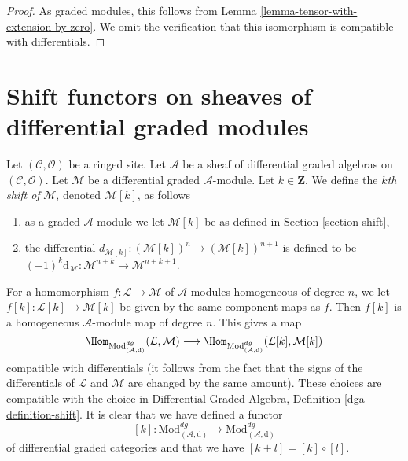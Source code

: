 \begin{proof}
As graded modules, this follows from
Lemma \ref{lemma-tensor-with-extension-by-zero}.
We omit the verification that this isomorphism
is compatible with differentials.
\end{proof}








\section{Shift functors on sheaves of differential graded modules}
\label{section-shift-dg}

\noindent
Let $(\mathcal{C}, \mathcal{O})$ be a ringed site.
Let $\mathcal{A}$ be a sheaf of differential graded algebras
on $(\mathcal{C}, \mathcal{O})$.
Let $\mathcal{M}$ be a differential graded $\mathcal{A}$-module.
Let $k \in \mathbf{Z}$. We define the {\it $k$th shift of} $\mathcal{M}$,
denoted $\mathcal{M}[k]$, as follows
\begin{enumerate}
\item as a graded $\mathcal{A}$-module we let $\mathcal{M}[k]$ be
as defined in Section \ref{section-shift},
\item the differential
$d_{\mathcal{M}[k]} : (\mathcal{M}[k])^n \to (\mathcal{M}[k])^{n + 1}$
is defined to be
$(-1)^k\text{d}_\mathcal{M} : \mathcal{M}^{n + k} \to \mathcal{M}^{n + k + 1}$.
\end{enumerate}
For a homomorphism $f : \mathcal{L} \to \mathcal{M}$ of $\mathcal{A}$-modules
homogeneous of degree $n$, we let $f[k] : \mathcal{L}[k] \to \mathcal{M}[k]$
be given by the same component maps as $f$. Then $f[k]$ is
a homogeneous $\mathcal{A}$-module map of degree $n$.
This gives a map
$$
\Hom_{\text{Mod}^{dg}_{(\mathcal{A}, \text{d})}}(\mathcal{L}, \mathcal{M})
\longrightarrow
\Hom_{\text{Mod}^{dg}_{(\mathcal{A}, \text{d})}}
(\mathcal{L}[k], \mathcal{M}[k])
$$
compatible with differentials (it follows from the fact
that the signs of the differentials of $\mathcal{L}$ and
$\mathcal{M}$ are changed by the same amount). These choices are
compatible with the choice in
Differential Graded Algebra, Definition \ref{dga-definition-shift}.
It is clear that we have defined a functor
$$
[k] :
\text{Mod}^{dg}_{(\mathcal{A}, \text{d})}
\longrightarrow
\text{Mod}^{dg}_{(\mathcal{A}, \text{d})}
$$
of differential graded categories and that we have
$[k + l] = [k] \circ [l]$.


